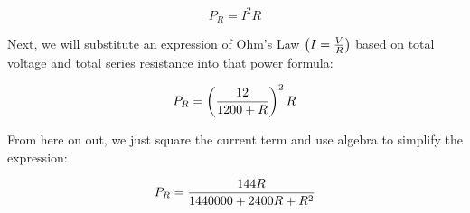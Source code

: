 $$P_R = I^2 R$$

\vskip 10pt

Next, we will substitute an expression of Ohm's Law $\left( I = {V \over R} \right)$ based on total voltage and total series resistance into that power formula:

$$P_R = \left({12 \over {1200 + R}}\right)^2 R$$

\vskip 10pt

From here on out, we just square the current term and use algebra to simplify the expression:

$$P_R = {{144 R} \over {1440000 + 2400R + R^2}}$$




